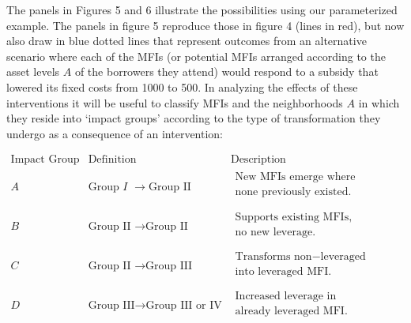 \documentclass[
]{article}
\begin{document}
The panels in Figures 5 and 6 illustrate the possibilities using our
parameterized example. The panels in figure 5 reproduce those in figure
4 (lines in red), but now also draw in blue dotted lines that represent
outcomes from an alternative scenario where each of the MFIs (or
potential MFIs arranged according to the asset levels \(A\) of the
borrowers they attend) would respond to a subsidy that lowered its fixed
costs from 1000 to 500. In analyzing the effects of these interventions
it will be useful to classify MFIs and the neighborhoods \(A\) in which
they reside into `impact groups' according to the type of transformation
they undergo as a consequence of an intervention:

\(\begin{matrix}
\mathrm{\text{Impact}}\mspace{6mu}\mathrm{\text{Group}} & \mathrm{\text{Definition}} & \mathrm{\text{Description}} \\
A & \mathrm{\text{Group}}\mspace{6mu} I\mspace{6mu} \rightarrow \mathrm{\text{Group}}\mspace{6mu}\mathrm{\text{II}} & \begin{matrix}
\mathrm{\text{New}}\mspace{6mu}\mathrm{\text{MFIs}}\mspace{6mu}\mathrm{\text{emerge}}\mspace{6mu}\mathrm{\text{where}}\mspace{6mu} \\
\mathrm{\text{none}}\mspace{6mu}\mathrm{\text{previously}}\mspace{6mu}\mathrm{\text{existed}}.\mspace{6mu} \\
\end{matrix} \\
B & \mathrm{\text{Group}}\mspace{6mu}\mathrm{\text{II}}\mspace{6mu} \rightarrow \mathrm{\text{Group}}\mspace{6mu}\mathrm{\text{II}} & \begin{matrix}
\mathrm{\text{Supports}}\mspace{6mu}\mathrm{\text{existing}}\mspace{6mu}\mathrm{\text{MFIs}},\mspace{6mu} \\
\mathrm{\text{no}}\mspace{6mu}\mathrm{\text{new}}\mspace{6mu}\mathrm{\text{leverage}}. \\
\end{matrix} \\
C & \mathrm{\text{Group}}\mspace{6mu}\mathrm{\text{II}}\mspace{6mu} \rightarrow \mathrm{\text{Group}}\mspace{6mu}\mathrm{\text{III}} & \begin{matrix}
\mathrm{\text{Transforms}}\mspace{6mu}\mathrm{\text{non}} - \mathrm{\text{leveraged}}\mspace{6mu} \\
\mathrm{\text{into}}\mspace{6mu}\mathrm{\text{leveraged}}\mspace{6mu}\mathrm{\text{MFI}}. \\
\end{matrix} \\
D & \mathrm{\text{Group}}\mspace{6mu}\mathrm{\text{III}} \rightarrow \mathrm{\text{Group}}\mspace{6mu}\mathrm{\text{III}}\mspace{6mu}\mathrm{\text{or}}\mspace{6mu}\mathrm{\text{IV}} & \begin{matrix}
\mathrm{\text{Increased}}\mspace{6mu}\mathrm{\text{leverage}}\mspace{6mu}\mathrm{\text{in}}\mspace{6mu} \\
\mathrm{\text{already}}\mspace{6mu}\mathrm{\text{leveraged}}\mspace{6mu}\mathrm{\text{MFI}}. \\
\end{matrix} \\
\end{matrix}\)
\end{document}
